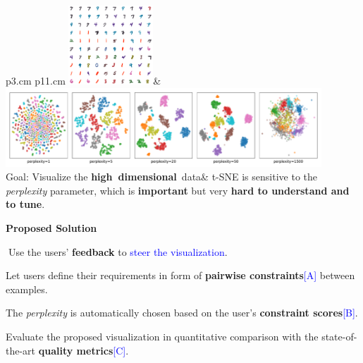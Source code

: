 \documentclass[portrait,final,a0paper]{nadiposter}
\newcommand{\compresslist}{%
\setlength{\itemsep}{1pt}%
\setlength{\parskip}{0pt}%
\setlength{\parsep}{0pt}%
\setlength{\leftmargin}{0pt}%
}
\begin{document}
\begin{poster}
{\begin{minipage}{0.63\linewidth}
    \begin{tabular}{p{3.cm} p{11.cm}}
        \includegraphics[height=8em]{images/mnist_raw200.pdf}&
        \includegraphics[height=8em]{images/MNIST-SMALL_examples.pdf}\\
        Goal: Visualize the \scriptsize{\textbf{high~dimensional}~data}&
        t-SNE is sensitive to the \emph{perplexity} parameter, which is \textbf{important} but very \textbf{hard to understand and to tune}.\\
    \end{tabular}
\end{minipage}
\begin{minipage}{0.33\linewidth}
    \begin{center} \Large{\textbf{Proposed Solution}}\end{center}
    $\;$Use the users' \textbf{feedback} to \textcolor{blue}{steer the visualization}.
    
    \begin{itemize}
        \compresslist{
            \item Let users define their requirements in form of \textbf{pairwise constraints}\textcolor{blue}{[A]} between examples.
            \item The \emph{perplexity} is automatically chosen based on the user's \textbf{constraint scores}\textcolor{blue}{[B]}.
            \item Evaluate the proposed visualization in quantitative comparison with the state-of-the-art \textbf{quality metrics}\textcolor{blue}{[C]}.
        }
    \end{itemize}
\end{minipage}
}

\end{poster}
\end{document}
